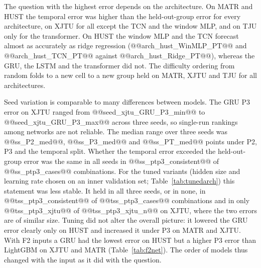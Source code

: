 \documentclass{ieeeaccess}
\newcommand{\fitcol}[1]{\footnotesize\resizebox{\ifdim\width>\columnwidth\columnwidth\else\width\fi}{!}{}}
\begin{document}
The question with the highest error depends on the architecture. On MATR and HUST the temporal error was higher than the held-out-group error for every architecture, on XJTU for all except the TCN and the window MLP, and on TJU only for the transformer. On HUST the window MLP and the TCN forecast almost as accurately as ridge regression (@@arch_hust_WinMLP_PT@@ and @@arch_hust_TCN_PT@@ against @@arch_hust_Ridge_PT@@), whereas the GRU, the LSTM and the transformer did not. The difficulty ordering from random folds to a new cell to a new group held on MATR, XJTU and TJU for all architectures.

Seed variation is comparable to many differences between models. The GRU P3 error on XJTU ranged from @@seed_xjtu_GRU_P3_min@@ to @@seed_xjtu_GRU_P3_max@@ across three seeds, so single-run rankings among networks are not reliable. The median range over three seeds was @@ss_P2_med@@, @@ss_P3_med@@ and @@ss_PT_med@@ points under P2, P3 and the temporal split. Whether the temporal error exceeded the held-out-group error was the same in all seeds in @@ss_ptp3_consistent@@ of @@ss_ptp3_cases@@ combinations. For the tuned variants (hidden size and learning rate chosen on an inner validation set; Table~\ref{tab:tunedarch}) this statement was less stable. It held in all three seeds, or in none, in @@tss_ptp3_consistent@@ of @@tss_ptp3_cases@@ combinations and in only @@tss_ptp3_xjtu@@ of @@tss_ptp3_xjtu_n@@ on XJTU, where the two errors are of similar size. Tuning did not alter the overall picture: it lowered the GRU error clearly only on HUST and increased it under P3 on MATR and XJTU. With F2 inputs a GRU had the lowest error on HUST but a higher P3 error than LightGBM on XJTU and MATR (Table~\ref{tab:f2net}). The order of models thus changed with the input as it did with the question.
\begin{table}[!tb]
\caption{RMSE (\% SOH) of tuned networks (GRU, LSTM, TCN, window MLP, CNN-GRU, GRU with attention, transformer, pooled MLP) and of the untuned CNN-GRU and GRU with attention under P2, P3 and the temporal split. Seed 0 of the tuning run.}
\label{tab:tunedarch}
\centering
\fitcol{tables/tuned_arch.tex}
\end{table}
\begin{table}[!tb]
\caption{RMSE (\% SOH) with F2 inputs for ridge regression, LightGBM and a GRU under P2, P3 and the temporal split (rows with an F2 feature vector).}
\label{tab:f2net}
\centering
\fitcol{tables/f2_networks.tex}
\end{table}
\end{document}
